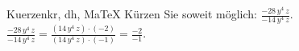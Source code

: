 \begin{MAufgabe}{Kuerzen}{kr, dh, MaTeX}
K\"urzen Sie soweit m\"oglich: $\frac{- 28\, y^4\, z}{- 14\, y^4\, z}$.\\ 
\ifLsg\MLoesung
\quad $\frac{- 28\, y^4\, z}{- 14\, y^4\, z}=\frac{(14\, y^4\, z)\cdot(-2)}{(14\, y^4\, z)\cdot(-1)}=\frac{-2}{-1}$.\else\relax\fi
 \end{MAufgabe}